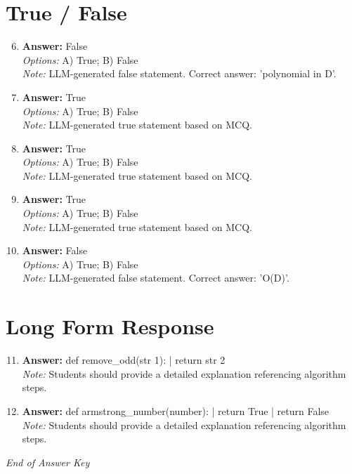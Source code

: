 \documentclass[12pt]{article}
\begin{document}
\section*{True / False}
\begin{enumerate}[label=\arabic*.]
\setcounter{enumi}{5}
\item \textbf{Answer:} False
\\ \textit{Options:} A) True; B) False
\\ \textit{Note:} LLM-generated false statement. Correct answer: 'polynomial in D'.
\item \textbf{Answer:} True
\\ \textit{Options:} A) True; B) False
\\ \textit{Note:} LLM-generated true statement based on MCQ.
\item \textbf{Answer:} True
\\ \textit{Options:} A) True; B) False
\\ \textit{Note:} LLM-generated true statement based on MCQ.
\item \textbf{Answer:} True
\\ \textit{Options:} A) True; B) False
\\ \textit{Note:} LLM-generated true statement based on MCQ.
\item \textbf{Answer:} False
\\ \textit{Options:} A) True; B) False
\\ \textit{Note:} LLM-generated false statement. Correct answer: 'O(D)'.
\end{enumerate}

\section*{Long Form Response}
\begin{enumerate}[label=\arabic*.]
\setcounter{enumi}{10}
\item \textbf{Answer:} def remove\_odd(str 1): | return str 2
\\ \textit{Note:} Students should provide a detailed explanation referencing algorithm steps.
\item \textbf{Answer:} def armstrong\_number(number): | return True | return False
\\ \textit{Note:} Students should provide a detailed explanation referencing algorithm steps.
\end{enumerate}

\vfill
\noindent\textit{End of Answer Key}
\end{document}
